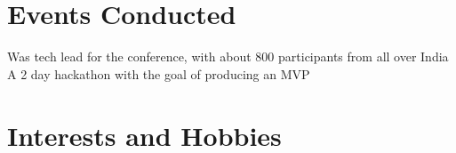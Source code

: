 \documentclass[11pt,a4paper]{moderncv}
\begin{document}

\section{Events Conducted}

{Was tech lead for the conference, with about 800 participants from all over India}
{A 2 day hackathon with the goal of producing an MVP}


\section{Interests and Hobbies}


\end{document}
